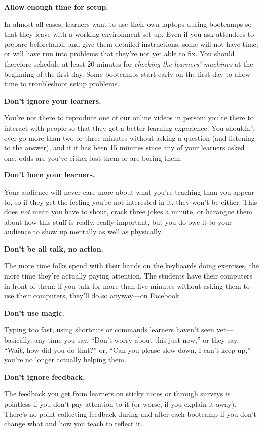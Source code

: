 \documentclass{book}
\begin{document}
\textbf{Allow enough time for setup.}

In almost all cases, learners want to use their own laptops during
bootcamps so that they leave with a working environment set up. Even if
you ask attendees to prepare beforehand, and give them detailed
instructions, some will not have time, or will have run into problems
that they're not yet able to fix. You should therefore schedule at least
20 minutes for \emph{checking the learners' machines} at the beginning
of the first day. Some bootcamps start early on the first day to allow
time to troubleshoot setup problems.

\textbf{Don't ignore your learners.}

You're not there to reproduce one of our online videos in person: you're
there to interact with people so that they get a better learning
experience. You shouldn't ever go more than two or three minutes without
asking a question (and listening to the answer), and if it has been 15
minutes since any of your learners asked one, odds are you've either
lost them or are boring them.

\textbf{Don't bore your learners.}

Your audience will never care more about what you're teaching than you
appear to, so if they get the feeling you're not interested in it, they
won't be either. This does \emph{not} mean you have to shout, crack
three jokes a minute, or harangue them about how this stuff is really,
really important, but you do owe it to your audience to show up mentally
as well as physically.

\textbf{Don't be all talk, no action.}

The more time folks spend with their hands on the keyboards doing
exercises, the more time they're actually paying attention. The students
have their computers in front of them: if you talk for more than five
minutes without asking them to use their computers, they'll do so
anyway---on Facebook.

\textbf{Don't use magic.}

Typing too fast, using shortcuts or commands learners haven't seen
yet---basically, any time you say, ``Don't worry about this just now,''
or they say, ``Wait, how did you do that?'' or, ``Can you please slow
down, I can't keep up,'' you're no longer actually helping them.

\textbf{Don't ignore feedback.}

The feedback you get from learners on sticky notes or through surveys is
pointless if you don't pay attention to it (or worse, if you explain it
away). There's no point collecting feedback during and after each
bootcamp if you don't change what and how you teach to reflect it.
\end{document}
